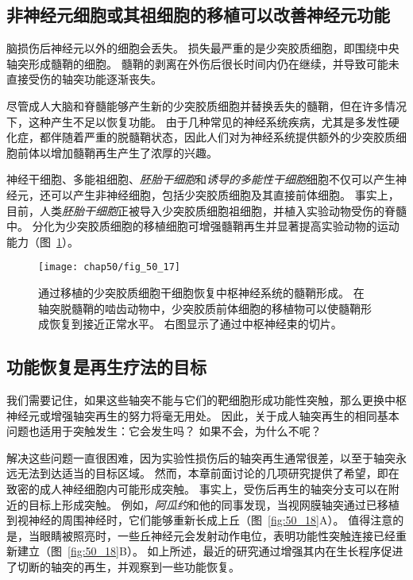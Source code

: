 \subsection{非神经元细胞或其祖细胞的移植可以改善神经元功能}

脑损伤后神经元以外的细胞会丢失。
损失最严重的是少突胶质细胞，即围绕中央轴突形成髓鞘的细胞。
髓鞘的剥离在外伤后很长时间内仍在继续，并导致可能未直接受伤的轴突功能逐渐丧失。


尽管成人大脑和脊髓能够产生新的少突胶质细胞并替换丢失的髓鞘，但在许多情况下，这种产生不足以恢复功能。
由于几种常见的神经系统疾病，尤其是多发性硬化症，都伴随着严重的脱髓鞘状态，因此人们对为神经系统提供额外的少突胶质细胞前体以增加髓鞘再生产生了浓厚的兴趣。


神经干细胞、多能祖细胞、\textit{胚胎干细胞}和\textit{诱导的多能性干细胞}细胞不仅可以产生神经元，还可以产生非神经细胞，包括少突胶质细胞及其直接前体细胞。
事实上，目前，人类\textit{胚胎干细胞}正被导入少突胶质细胞祖细胞，并植入实验动物受伤的脊髓中。
分化为少突胶质细胞的移植细胞可增强髓鞘再生并显著提高实验动物的运动能力（图~\ref{fig:50_17}）。


\begin{figure}[htbp]
	\centering
	\texttt{[image: chap50/fig\_50\_17]}
	\caption{通过移植的少突胶质细胞干细胞恢复中枢神经系统的髓鞘形成。
		在轴突脱髓鞘的啮齿动物中，少突胶质前体细胞的移植物可以使髓鞘形成恢复到接近正常水平。
		右图显示了通过中枢神经束的切片\cite{franklin2008remyelination}。}
	\label{fig:50_17}
\end{figure}


\subsection{功能恢复是再生疗法的目标}

我们需要记住，如果这些轴突不能与它们的靶细胞形成功能性突触，那么更换中枢神经元或增强轴突再生的努力将毫无用处。
因此，关于成人轴突再生的相同基本问题也适用于突触发生：它会发生吗？
如果不会，为什么不呢？


解决这些问题一直很困难，因为实验性损伤后的轴突再生通常很差，以至于轴突永远无法到达适当的目标区域。
然而，本章前面讨论的几项研究提供了希望，即在致密的成人神经细胞内可能形成突触。
事实上，受伤后再生的轴突分支可以在附近的目标上形成突触。
例如，\textit{阿瓜约}和他的同事发现，当视网膜轴突通过已移植到视神经的周围神经时，它们能够重新长成上丘（图~\ref{fig:50_18}A）。
值得注意的是，当眼睛被照亮时，一些丘神经元会发射动作电位，表明功能性突触连接已经重新建立（图~\ref{fig:50_18}B）。
如上所述，最近的研究通过增强其内在生长程序促进了切断的轴突的再生，并观察到一些功能恢复。


